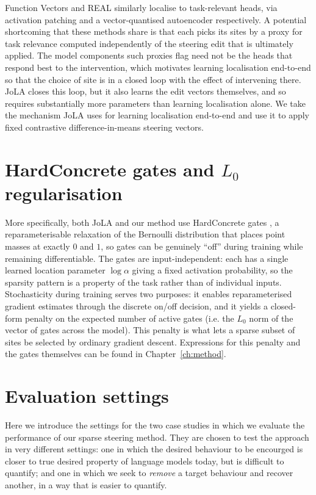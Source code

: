 \documentclass[logo,msc,notimes]{infthesis}
\begin{document}
Function Vectors \citep{todd2024functionvectors} and REAL \citep{zhan2026real} similarly localise to
task-relevant heads, via activation patching and a vector-quantised autoencoder respectively. A potential shortcoming that these methods share is that each picks its sites by a proxy for task relevance computed independently of the
steering edit that is ultimately applied. The model components such proxies flag need not be the heads
that respond best to the intervention, which motivates learning localisation end-to-end so that the
choice of site is in a closed loop with the effect of intervening there. JoLA closes this loop, but
it also learns the edit vectors themselves, and so requires substantially more parameters than
learning localisation alone. We take the mechanism JoLA uses for learning localisation end-to-end and use it to apply fixed contrastive difference-in-means steering vectors.

\section{HardConcrete gates and $L_0$ regularisation}\label{sec:hardconcrete}

More specifically, both JoLA and our method use HardConcrete gates \citep{louizos2018hardconcrete}, a reparameterisable
relaxation of the Bernoulli distribution that places point masses at exactly $0$ and $1$, so gates
can be genuinely ``off'' during training while remaining differentiable. The gates are
input-independent: each has a single learned location parameter $\log\alpha$ giving a fixed
activation probability, so the sparsity pattern is a property of the task rather than of individual
inputs. Stochasticity during training serves two purposes: it enables reparameterised gradient
estimates through the discrete on/off decision, and it yields a closed-form penalty on the expected
number of active gates (i.e. the $L_0$ norm of the vector of gates across the model). This penalty is what lets a sparse subset of sites be selected by ordinary
gradient descent. Expressions for this penalty and the gates themselves can be found in
Chapter~\ref{ch:method}.

\section{Evaluation settings}\label{sec:eval-settings}

Here we introduce the settings for the two case studies in which we evaluate the performance of our sparse steering method. They are chosen to test the approach in very different settings: one in which the desired behaviour to be encourged is closer to true desired property of language models today, but is difficult to quantify; and one in which we seek to \emph{remove} a target behaviour and recover another, in a way that is easier to quantify.
\end{document}
